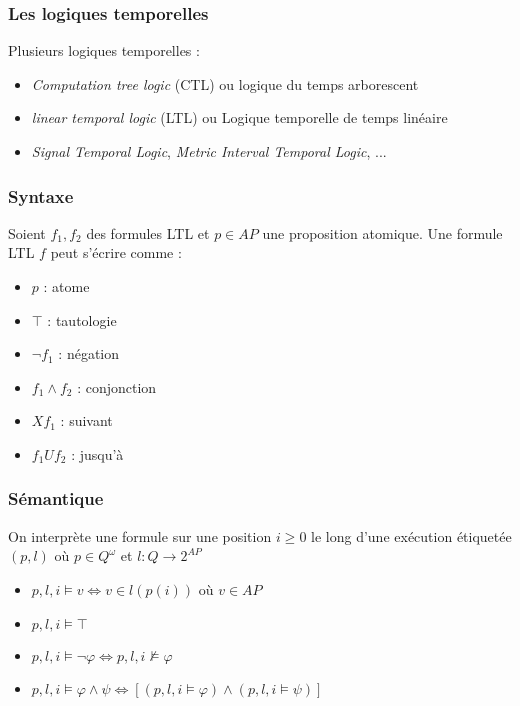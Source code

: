 \documentclass{beamer}
\theoremstyle{plain}
\theoremstyle{definition}
\begin{document}
\begin{frame}
  \frametitle{Les logiques temporelles}

  \pause
  Plusieurs logiques temporelles :
  \begin{itemize}[<+->]
  \item \textit{Computation tree logic} (CTL) ou logique du temps arborescent
  \item \textit{linear temporal logic} (LTL) ou Logique temporelle de temps linéaire
  \item \textit{Signal Temporal Logic}, \textit{Metric Interval Temporal Logic}, ...
  \end{itemize}
\end{frame}

\begin{frame}
  \frametitle{Syntaxe}

  Soient $f_1, f_2$ des formules LTL et $p \in AP$ une proposition atomique.
  Une formule LTL $f$ peut s'écrire comme :
  \begin{itemize}
  \item $p$ : atome
  \item $\top$ : tautologie
  \item $\lnot f_1$ : négation
  \item $f_1 \land f_2$ : conjonction
    \pause
  \item $X f_1$ : suivant
  \item $f_1 U f_2$ : jusqu'à
  \end{itemize}  
\end{frame}


\begin{frame}
  \frametitle{Sémantique}

  On interprète une formule sur une position $i \geq 0$ le long d'une exécution étiquetée $(p, l)$ où $p \in Q^\omega$ et $l : Q \to 2^{AP}$ 

  \vfill  
  \vfill
  
  \pause
  
  \begin{itemize}
  \item $p,l,i \models v \Leftrightarrow v \in l(p(i))$ où $v \in AP$
  \item $p,l,i \models \top$
  \item $p,l,i \models \lnot \varphi \Leftrightarrow p,l,i \not \models \varphi$
  \item $p,l,i \models \varphi \land \psi \Leftrightarrow [(p,l,i \models \varphi) \land (p,l,i \models \psi)]$
  \end{itemize}
\end{frame}
\end{document}
